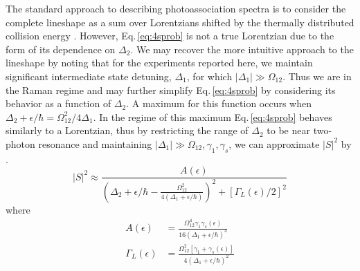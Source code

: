 The standard approach to describing photoassociation spectra is to consider the complete lineshape as a sum over Lorentzians shifted by the thermally distributed collision energy \cite{Julienne1989,Napolitano1994,Cote1995}.
However, Eq.\,\ref{eq:4sprob} is not a true Lorentzian due to the form of its dependence on $\Delta_2$.
We may recover the more intuitive approach to the lineshape by noting that for the experiments reported here, we maintain significant intermediate state detuning, $\Delta_1$, for which $|\Delta_1| \gg \Omega_{12}$.
Thus we are in the Raman regime and may further simplify Eq.\,\ref{eq:4sprob} by considering its behavior as a function of $\Delta_2$.
A maximum for this function occurs when $\Delta_2 + \epsilon/\hbar = \Omega_{12}^2/4 \Delta_1$.
In the regime of this maximum Eq.\,\ref{eq:4sprob} behaves similarly to a Lorentzian, thus by restricting the range of $\Delta_2$ to be near two-photon resonance and maintaining $|\Delta_1| \gg \Omega_{12}, \gamma_1, \gamma_s$, we can approximate $\vert  S \vert^2$ by \cite{Pachomov2017, Pachomow2017a}.
\begin{equation}
 \vert S\vert^2 \approx \frac{A(\epsilon)}{\left( \Delta_2+\epsilon/\hbar-\frac{\Omega_{12}^{2}} {4(\Delta_1+\epsilon/\hbar)}\right)^2+\left[ {\Gamma_L(\epsilon)}/{2}\right]^2}
\end{equation}
where 
\begingroup
\addtolength{\jot}{1em}
\begin{align}
  A(\epsilon) &= \frac{\Omega_{12}^{4}\gamma_1 \gamma_s(\epsilon)}{16(\Delta_1+\epsilon/\hbar)^4} \\
  \Gamma_L(\epsilon) &= \frac{\Omega_{12}^{2}[\gamma_1 +\gamma_s(\epsilon)]}{4(\Delta_1+\epsilon/\hbar)^2}
\end{align}
\endgroup

